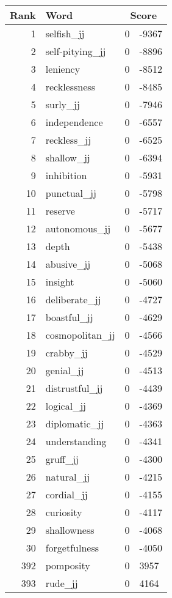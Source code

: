 \begin{longtable}[!htbp]{| rlr@{.}l |}
    \hline
    \textbf{Rank} & \textbf{Word} & \multicolumn{2}{c|}{\textbf{Score}} \\
    \hline
    \endhead
    1 & selfish\_jj & 0 & -9367 \\
    2 & self-pitying\_jj & 0 & -8896 \\
    3 & leniency & 0 & -8512 \\
    4 & recklessness & 0 & -8485 \\
    5 & surly\_jj & 0 & -7946 \\
    6 & independence & 0 & -6557 \\
    7 & reckless\_jj & 0 & -6525 \\
    8 & shallow\_jj & 0 & -6394 \\
    9 & inhibition & 0 & -5931 \\
    10 & punctual\_jj & 0 & -5798 \\
    11 & reserve & 0 & -5717 \\
    12 & autonomous\_jj & 0 & -5677 \\
    13 & depth & 0 & -5438 \\
    14 & abusive\_jj & 0 & -5068 \\
    15 & insight & 0 & -5060 \\
    16 & deliberate\_jj & 0 & -4727 \\
    17 & boastful\_jj & 0 & -4629 \\
    18 & cosmopolitan\_jj & 0 & -4566 \\
    19 & crabby\_jj & 0 & -4529 \\
    20 & genial\_jj & 0 & -4513 \\
    21 & distrustful\_jj & 0 & -4439 \\
    22 & logical\_jj & 0 & -4369 \\
    23 & diplomatic\_jj & 0 & -4363 \\
    24 & understanding & 0 & -4341 \\
    25 & gruff\_jj & 0 & -4300 \\
    26 & natural\_jj & 0 & -4215 \\
    27 & cordial\_jj & 0 & -4155 \\
    28 & curiosity & 0 & -4117 \\
    29 & shallowness & 0 & -4068 \\
    30 & forgetfulness & 0 & -4050 \\
    392 & pomposity & 0 & 3957 \\
    393 & rude\_jj & 0 & 4164 \\

\end{longtable}
